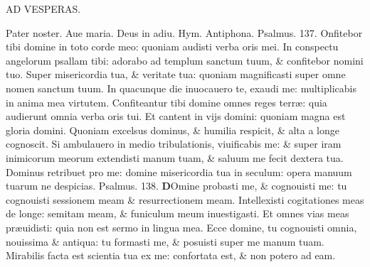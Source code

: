 \documentclass[a5paper,10pt]{book}
\def\ae{æ}
\begin{document}
\begin{multicols*}{2}
\begin{center}
AD VESPERAS.
\end{center}
\vspace{-1em}
\par \noindent \color{red} P\color{black}ater noster. Aue maria. Deus in adiu. \color{red} Hym. Antiphona. Psalmus. 137. \color{black}
Onfitebor tibi domine in toto corde meo: quoniam audisti verba oris mei.
\newline \color{red} I\color{black}n conspectu angelorum psallam tibi: adorabo ad templum sanctum tuum, \& confitebor nomini tuo.
\newline \color{red} S\color{black}uper misericordia tua, \& veritate tua: quoniam magnificasti super omne nomen sanctum tuum.
\newline \color{red} I\color{black}n quacunque die inuocauero te, exaudi me: multiplicabis in anima mea virtutem.
\newline \color{red} C\color{black}onfiteantur tibi domine omnes reges terr\ae : quia audierunt omnia verba oris tui.
\newline \color{red} E\color{black}t cantent in vijs domini: quoniam magna est gloria domini.
\newline \color{red} Q\color{black}uoniam excelsus dominus, \& humilia respicit, \& alta a longe cognoscit.
\newline \color{red} S\color{black}i ambulauero in medio tribulationis, viuificabis me: \& super iram inimicorum meorum extendisti manum tuam, \& saluum me fecit dextera tua.
\newline \color{red} D\color{black}ominus retribuet pro me: domine misericordia tua in seculum: opera manuum tuarum ne despicias.
\newline \color{red} Psalmus. 138. \color{black}
\lettrine[lines=2]{\bfseries \color{red} D}{}Omine probasti me, \& cognouisti me: tu cognouisti sessionem meam \& resurrectionem meam.
\newline \color{red} I\color{black}ntellexisti cogitationes meas de longe: semitam meam, \& funiculum meum inuestigasti.
\newline \color{red} E\color{black}t omnes vias meas pr\ae uidisti: quia non est sermo in lingua mea.
\newline \color{red} E\color{black}cce domine, tu cognouisti omnia, nouissima \& antiqua: tu formasti me, \& posuisti super me manum tuam.
\newline \color{red} M\color{black}irabilis facta est scientia tua ex me: confortata est, \& non potero ad eam.

\end{multicols*}
\end{document}
